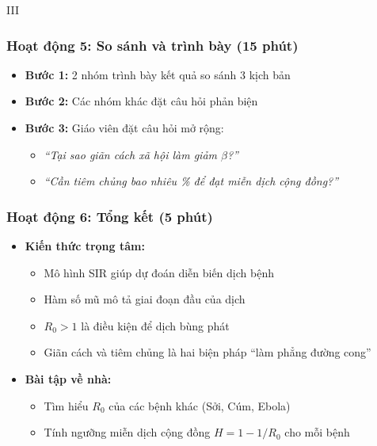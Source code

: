 \documentclass[12pt,a4paper]{article}
\begin{document}
\begin{competitionsection}{III}
\subsubsection*{Hoạt động 5: So sánh và trình bày (15 phút)}
\begin{itemize}[leftmargin=*,noitemsep]
\item \textbf{Bước 1:} 2 nhóm trình bày kết quả so sánh 3 kịch bản
\item \textbf{Bước 2:} Các nhóm khác đặt câu hỏi phản biện
\item \textbf{Bước 3:} Giáo viên đặt câu hỏi mở rộng:
    \begin{itemize}
    \item \textit{``Tại sao giãn cách xã hội làm giảm $\beta$?''}
    \item \textit{``Cần tiêm chủng bao nhiêu \% để đạt miễn dịch cộng đồng?''}
    \end{itemize}
\end{itemize}

\subsubsection*{Hoạt động 6: Tổng kết (5 phút)}
\begin{itemize}[leftmargin=*,noitemsep]
\item \textbf{Kiến thức trọng tâm:}
    \begin{itemize}
    \item Mô hình SIR giúp dự đoán diễn biến dịch bệnh
    \item Hàm số mũ mô tả giai đoạn đầu của dịch
    \item $R_0 > 1$ là điều kiện để dịch bùng phát
    \item Giãn cách và tiêm chủng là hai biện pháp ``làm phẳng đường cong''
    \end{itemize}
\item \textbf{Bài tập về nhà:}
    \begin{itemize}
    \item Tìm hiểu $R_0$ của các bệnh khác (Sởi, Cúm, Ebola)
    \item Tính ngưỡng miễn dịch cộng đồng $H = 1 - 1/R_0$ cho mỗi bệnh
    \end{itemize}
\end{itemize}
\end{competitionsection}
\newpage
\end{document}
